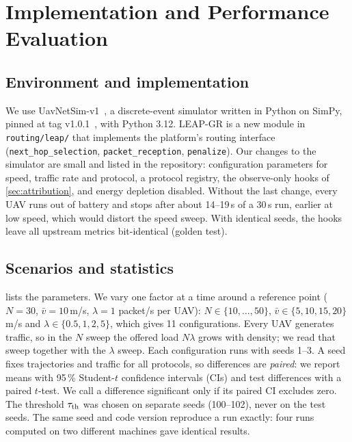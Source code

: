 \section{Implementation and Performance Evaluation}
\label{sec:eval}

\subsection{Environment and implementation}

We use UavNetSim-v1~\cite{zhou2025uavnetsim}, a discrete-event simulator written in Python on SimPy, pinned at
tag v1.0.1~\cite{zhou2026repo}, with Python 3.12. LEAP-GR is a new module in \texttt{routing/leap/} that
implements the platform's routing interface (\texttt{next\_hop\_selection}, \texttt{packet\_reception},
\texttt{penalize}). Our changes to the simulator are small and listed in the repository: configuration
parameters for speed, traffic rate and protocol, a protocol registry, the observe-only hooks of
\cref{sec:attribution}, and energy depletion disabled. Without the last change, every UAV runs out of
battery and stops after about 14--19\,s of a 30\,s run, earlier at low speed, which would distort the speed
sweep. With identical seeds, the hooks leave all upstream metrics bit-identical (golden test).

\subsection{Scenarios and statistics}

 lists the parameters. We vary one factor at a time around a reference point ($N=30$,
$\bar v=10$\,m/s, $\lambda=1$ packet/s per UAV): $N\in\{10,\dots,50\}$, $\bar v\in\{5,10,15,20\}$\,m/s and
$\lambda\in\{0.5,1,2,5\}$, which gives 11 configurations. Every UAV generates traffic, so in the $N$ sweep the
offered load $N\lambda$ grows with density; we read that sweep together with the $\lambda$ sweep. Each
configuration runs with seeds 1--3. A seed fixes trajectories and traffic for all protocols, so differences
are \emph{paired}: we report means with 95\,\% Student-$t$ confidence intervals (CIs) and test differences with
a paired $t$-test. We call a difference significant only if its paired CI excludes zero. The threshold
$\tau_{\mathrm{th}}$ was chosen on separate seeds (100--102), never on the test seeds. The same seed and code version
reproduce a run exactly: four runs computed on two different machines gave identical results.

